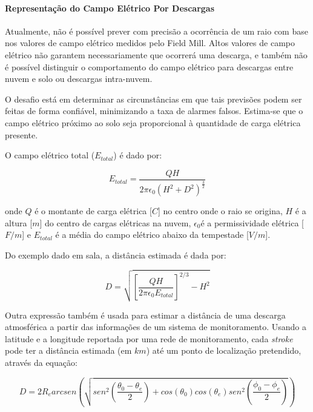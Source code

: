 \documentclass[a4paper, 12pt, onecolumn,singlespacing]{article}
\begin{document}
		\paragraph{Representação do Campo Elétrico Por Descargas}
		
		Atualmente, não é possível prever com precisão a ocorrência de um raio com base nos valores de campo elétrico medidos pelo Field Mill. Altos valores de campo elétrico não garantem necessariamente que ocorrerá uma descarga, e também não é possível distinguir o comportamento do campo elétrico para descargas entre nuvem e solo ou descargas intra-nuvem.
		
		O desafio está em determinar as circunstâncias em que tais previsões podem ser feitas de forma confiável, minimizando a taxa de alarmes falsos. Estima-se que o campo elétrico próximo ao solo seja proporcional à quantidade de carga elétrica presente.
		
		O campo elétrico total ($E_{total}$) é dado por:
		
		\begin{equation}
			E_{total} = \frac{QH}{2 \pi \epsilon_0 \left(H^2 + D^2\right)^{\frac{3}{2}}}
		\end{equation}
	
		onde $Q$ é o montante de carga elétrica [$C$] no centro onde o raio se origina, $H$ é a altura [$m$] do centro de cargas elétricas na nuvem, $\epsilon_0$é a permissividade elétrica [$F/m$] e $E_{total}$ é a média do campo elétrico abaixo da tempestade [$V/m$].
		
		Do exemplo dado em sala, a distância estimada é dada por:
		
		\begin{equation}
			D = \sqrt{\left[\frac{QH}{2 \pi \epsilon_0 E_{total}}\right]^{2/3} -H^2}
		\end{equation}
	
		Outra expressão também é usada para estimar a distância de uma descarga atmosférica a partir das informações de um sistema de monitoramento. Usando a latitude e a longitude reportada por uma rede de monitoramento, cada \textit{stroke} pode ter a distância estimada (em $km$) até um ponto de localização pretendido, através da equação:
		
		\begin{equation}
			D = 2 R_e arcsen\left(\sqrt{sen^2\left(\frac{\theta_0-\theta_e}{2}\right) + cos(\theta_0) cos (\theta_e) sen^2\left(\frac{\phi_0 - \phi_e}{2}\right)}\right)
		\end{equation}
	
\end{document}

